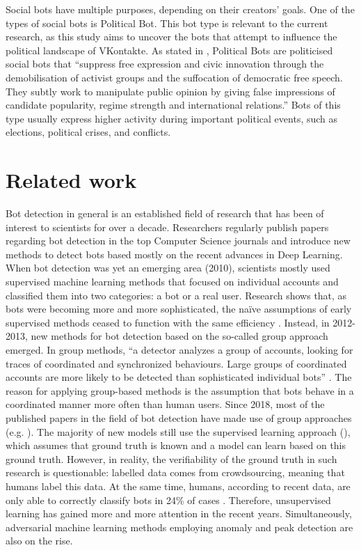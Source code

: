 Social bots have multiple purposes, depending on their creators' goals. One of the types of social bots is Political Bot. This bot type is relevant to the current research, as this study aims to uncover the bots that attempt to influence the political landscape of VKontakte. As stated in \cite{woolley2016automating}, Political Bots are politicised social bots that ``suppress free expression and civic innovation through the demobilisation of activist groups and the suffocation of democratic free speech. They subtly work to manipulate public opinion by giving false impressions of candidate popularity, regime strength and international relations.'' Bots of this type usually express higher activity during important political events, such as elections, political crises, and conflicts.

\section{Related work}
\label{sec:related-work}

Bot detection in general is an established field of research that has been of interest to scientists for over a decade. Researchers regularly publish papers regarding bot detection in the top Computer Science journals and introduce new methods to detect bots based mostly on the recent advances in Deep Learning. When bot detection was yet an emerging area (2010), scientists mostly used supervised machine learning methods that focused on individual accounts and classified them into two categories: a bot or a real user. Research shows that, as bots were becoming more and more sophisticated, the naïve assumptions of early supervised methods ceased to function with the same efficiency \cite{Cresci2020}. Instead, in 2012-2013, new methods for bot detection based on the so-called group approach emerged. In group methods, ``a detector analyzes a group of accounts, looking for traces of coordinated and synchronized behaviours. Large groups of coordinated accounts are more likely to be detected than sophisticated individual bots'' \cite{Cresci2020}. The reason for applying group-based methods is the assumption that bots behave in a coordinated manner more often than human users. Since 2018, most of the published papers in the field of bot detection have made use of group approaches (e.g. \cite{Cresci2020a}). The majority of new models still use the supervised learning approach (\cite{Cresci2020a}), which assumes that ground truth is known and a model can learn based on this ground truth. However, in reality, the verifiability of the ground truth in such research is questionable: labelled data comes from crowdsourcing, meaning that humans label this data. At the same time, humans, according to recent data, are only able to correctly classify bots in 24\% of cases \cite{Cresci2020}. Therefore, unsupervised learning has gained more and more attention in the recent years. Simultaneously, adversarial machine learning methods employing anomaly and peak detection are also on the rise.

